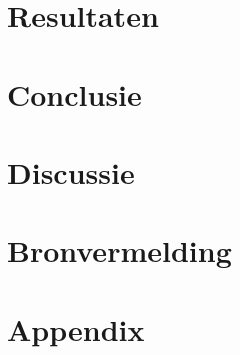 \documentclass[a4paper,10pt]{article}
\begin{document}
\section{Resultaten}
\section{Conclusie}
\section{Discussie}
\section{Bronvermelding}
\section{Appendix}
\appendix
\end{document}
